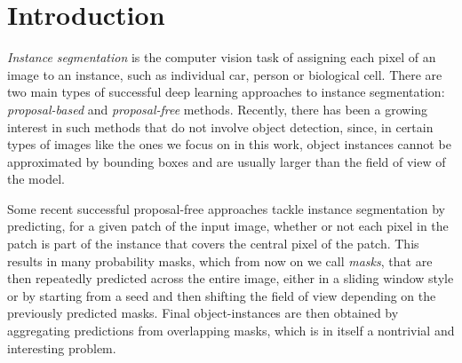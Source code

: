 
\section{Introduction}\label{sec:intro}

\emph{Instance segmentation} is the computer vision task of assigning each pixel of an image to an instance, such as individual car, person or biological cell. %
There are two main types of successful deep learning approaches to instance segmentation: \emph{proposal-based} and \emph{proposal-free} methods. 
Recently, there has been a growing interest in such methods that do not involve object detection, since, in certain types of images like the ones we focus on in this work, object instances cannot be approximated by bounding boxes and are usually larger than the field of view of the model.  

 
Some recent successful proposal-free approaches \cite{januszewski2018high,meirovitch2016multi,liu2016multi} tackle instance segmentation by predicting, for a given patch of the input image, whether or not each pixel in the patch is part of the instance that covers the central pixel of the patch. 
This results in many probability masks, which from now on we call \emph{\maskname masks}, that are then repeatedly predicted across the entire image, either in a sliding window style or by starting from a seed and then shifting the field of view depending on the previously predicted masks. 
Final object-instances are then obtained by aggregating predictions from overlapping masks, which is in itself a nontrivial and interesting problem.

